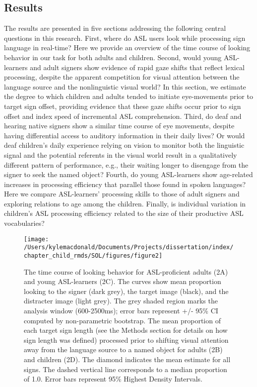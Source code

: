 \documentclass[oneside]{report}
\begin{document}
\subsection{Results}\label{results}

The results are presented in five sections addressing the following
central questions in this research. First, where do ASL users look while
processing sign language in real-time? Here we provide an overview of
the time course of looking behavior in our task for both adults and
children. Second, would young ASL-learners and adult signers show
evidence of rapid gaze shifts that reflect lexical processing, despite
the apparent competition for visual attention between the language
source and the nonlinguistic visual world? In this section, we estimate
the degree to which children and adults tended to initiate eye-movements
prior to target sign offset, providing evidence that these gaze shifts
occur prior to sign offset and index speed of incremental ASL
comprehension. Third, do deaf and hearing native signers show a similar
time course of eye movements, despite having differential access to
auditory information in their daily lives? Or would deaf children's
daily experience relying on vision to monitor both the linguistic signal
and the potential referents in the visual world result in a
qualitatively different pattern of performance, e.g., their waiting
longer to disengage from the signer to seek the named object? Fourth, do
young ASL-learners show age-related increases in processing efficiency
that parallel those found in spoken languages? Here we compare
ASL-learners' processing skills to those of adult signers and exploring
relations to age among the children. Finally, is individual variation in
children's ASL processing efficiency related to the size of their
productive ASL vocabularies?
\begin{figure}[t]

{\centering \texttt{[image: /Users/kylemacdonald/Documents/Projects/dissertation/index/chapter\_child\_rmds/SOL/figures/figure2]} 

}

\caption[Time course looking behavior for ASL-proficient adults and young ASL-learners]{The time course of looking behavior for ASL-proficient adults (2A) and young ASL-learners (2C). The curves show mean proportion looking to the signer (dark grey), the target image (black), and the distracter image (light grey). The grey shaded region marks the analysis window (600-2500ms); error bars represent +/- 95\% CI computed by non-parametric bootstrap. The mean proportion of each target sign length (see the Methods section for details on how sign length was defined) processed prior to shifting visual attention away from the language source to a named object for adults (2B) and children (2D). The diamond indicates the mean estimate for all signs. The dashed vertical line corresponds to a median proportion of 1.0. Error bars represent 95\% Highest Density Intervals.}\label{fig:sol-tc-figure}
\end{figure}
\end{document}
